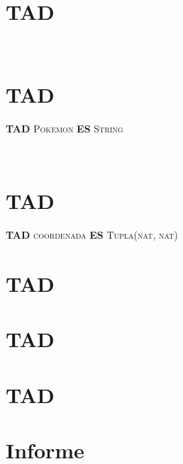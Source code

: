 \documentclass[10pt, a4paper]{article}
\begin{document}
\maketitle
\thispagestyle{empty}


\tableofcontents

\pagebreak

\section{TAD }


$ $\newline
$ $\newline
$ $\newline
$ $\newline
\section{TAD }

\textbf{TAD} \textsc{Pokemon} \textbf{ES} \textsc{String}

$ $\newline
$ $\newline
\section{TAD }

\textbf{TAD} \textsc{coordenada} \textbf{ES} \textsc{Tupla(nat, nat)}


\newpage


\section{TAD }



%

\newpage
\section{TAD }




\newpage
\section{TAD }



\newpage
\section{Informe}


\end{document}
